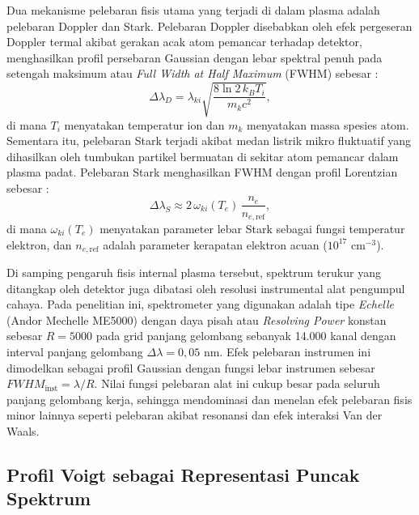 Dua mekanisme pelebaran fisis utama yang terjadi di dalam plasma adalah pelebaran Doppler dan Stark. Pelebaran Doppler disebabkan oleh efek pergeseran Doppler termal akibat gerakan acak atom pemancar terhadap detektor, menghasilkan profil persebaran Gaussian dengan lebar spektral penuh pada setengah maksimum atau \textit{Full Width at Half Maximum} (FWHM) sebesar \citep{griem_spectral_1974}:
\begin{equation} \label{eq:bab2_doppler}
\Delta\lambda_D = \lambda_{ki}\sqrt{\frac{8\ln 2\,k_B T_i}{m_k c^2}},
\end{equation}
di mana $T_i$ menyatakan temperatur ion dan $m_k$ menyatakan massa spesies atom. Sementara itu, pelebaran Stark terjadi akibat medan listrik mikro fluktuatif yang dihasilkan oleh tumbukan partikel bermuatan di sekitar atom pemancar dalam plasma padat. Pelebaran Stark menghasilkan FWHM dengan profil Lorentzian sebesar \citep{griem_spectral_1974}:
\begin{equation} \label{eq:bab2_stark}
\Delta\lambda_S \approx 2\,\omega_{ki}(T_e)\,\frac{n_e}{n_{e,\mathrm{ref}}},
\end{equation}
di mana $\omega_{ki}(T_e)$ menyatakan parameter lebar Stark sebagai fungsi temperatur elektron, dan $n_{e,\mathrm{ref}}$ adalah parameter kerapatan elektron acuan ($10^{17}$ cm$^{-3}$).

Di samping pengaruh fisis internal plasma tersebut, spektrum terukur yang ditangkap oleh detektor juga dibatasi oleh resolusi instrumental alat pengumpul cahaya. Pada penelitian ini, spektrometer yang digunakan adalah tipe \textit{Echelle} (Andor Mechelle ME5000) dengan daya pisah atau \textit{Resolving Power} konstan sebesar $R = 5000$ pada grid panjang gelombang sebanyak 14.000 kanal dengan interval panjang gelombang $\Delta\lambda = 0,05$ nm. Efek pelebaran instrumen ini dimodelkan sebagai profil Gaussian dengan fungsi lebar instrumen sebesar $FWHM_{\mathrm{inst}} = \lambda / R$. Nilai fungsi pelebaran alat ini cukup besar pada seluruh panjang gelombang kerja, sehingga mendominasi dan menelan efek pelebaran fisis minor lainnya seperti pelebaran akibat resonansi dan efek interaksi Van der Waals.

\subsection{Profil Voigt sebagai Representasi Puncak Spektrum} \label{subsec:bab2_voigt}

